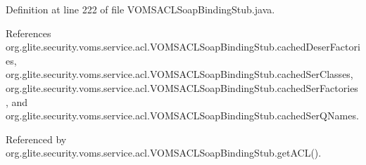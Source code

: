 \label{classorg_1_1glite_1_1security_1_1voms_1_1service_1_1acl_1_1VOMSACLSoapBindingStub_a7e3259b2df1531b0c1f7fc4b436aa592}


Definition at line 222 of file VOMSACLSoapBindingStub.java.



References org.glite.security.voms.service.acl.VOMSACLSoapBindingStub.cachedDeserFactories, org.glite.security.voms.service.acl.VOMSACLSoapBindingStub.cachedSerClasses, org.glite.security.voms.service.acl.VOMSACLSoapBindingStub.cachedSerFactories, and org.glite.security.voms.service.acl.VOMSACLSoapBindingStub.cachedSerQNames.



Referenced by org.glite.security.voms.service.acl.VOMSACLSoapBindingStub.getACL().


\begin{DoxyCode}
                                                                                 

\end{DoxyCode}
